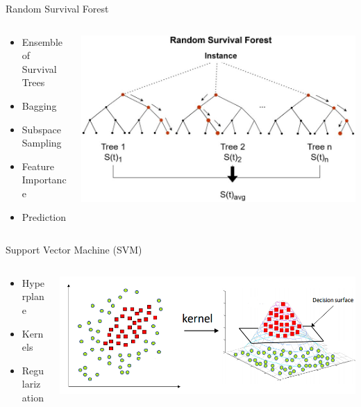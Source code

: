 \documentclass{beamer}
\begin{document}
\begin{frame}{Random Survival Forest}
\begin{columns}
    \begin{column}{.49\textwidth}
    \begin{itemize}
    \item Ensemble of Survival Trees
    \item Bagging
    \item Subspace Sampling
    \item Feature Importance
    \item Prediction
    \end{itemize}
    \cite{IshwaranEtAl}
    \end{column}
    \begin{column}{.49\textwidth}
    \centering
    \includegraphics[width = \textwidth]{images/rsf.png}
    \end{column}
\end{columns}

\end{frame}

\begin{frame}{Support Vector Machine (SVM)}
\begin{columns}
    \begin{column}{0.49 \textwidth}
    \begin{itemize}
        \item Hyperplane
        \item Kernels
        \item Regularization
    \end{itemize}
    \cite{WangEtAl}
    \end{column}
    \begin{column}{0.49 \textwidth}
        \centering
        \includegraphics[width = \textwidth]{images/svm.png}
    \end{column}
\end{columns}
\end{frame}
\end{document}
